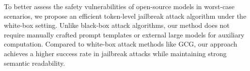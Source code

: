 To better assess the safety vulnerabilities of open-source models in worst-case scenarios, we propose an efficient token-level jailbreak attack algorithm under the white-box setting. Unlike black-box attack algorithms, our method does not require manually crafted prompt templates or external large models for auxiliary computation. Compared to white-box attack methods like GCG, our approach achieves a higher success rate in jailbreak attacks while maintaining strong semantic readability.